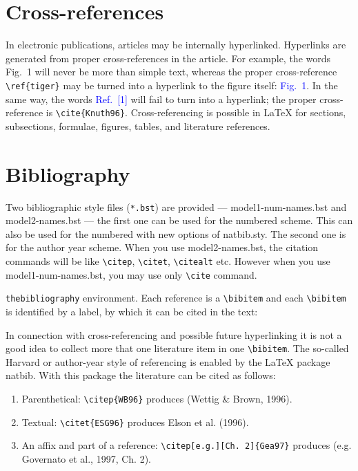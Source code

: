 \documentclass[a4paper,fleqn]{cas-dc}
\begin{document}
			\section{Cross-references}
			In electronic publications, articles may be internally
			hyperlinked. Hyperlinks are generated from proper
			cross-references in the article.  For example, the words
			\textcolor{black!80}{Fig.~1} will never be more than simple text,
			whereas the proper cross-reference \verb+\ref{tiger}+ may be
			turned into a hyperlink to the figure itself:
			\textcolor{blue}{Fig.~1}.  In the same way,
			the words \textcolor{blue}{Ref.~[1]} will fail to turn into a
			hyperlink; the proper cross-reference is \verb+\cite{Knuth96}+.
			Cross-referencing is possible in \LaTeX{} for sections,
			subsections, formulae, figures, tables, and literature
			references.
			
			\section{Bibliography}
			
			Two bibliographic style files (\verb+*.bst+) are provided ---
			{model1-num-names.bst} and {model2-names.bst} --- the first one can be
			used for the numbered scheme. This can also be used for the numbered
			with new options of {natbib.sty}. The second one is for the author year
			scheme. When  you use model2-names.bst, the citation commands will be
			like \verb+\citep+,  \verb+\citet+, \verb+\citealt+ etc. However when
			you use model1-num-names.bst, you may use only \verb+\cite+ command.
			
			\verb+thebibliography+ environment.  Each reference is a\linebreak
			\verb+\bibitem+ and each \verb+\bibitem+ is identified by a label,
			by which it can be cited in the text:
			
			\noindent In connection with cross-referencing and
			possible future hyperlinking it is not a good idea to collect
			more that one literature item in one \verb+\bibitem+.  The
			so-called Harvard or author-year style of referencing is enabled
			by the \LaTeX{} package {natbib}. With this package the
			literature can be cited as follows:
			
			\begin{enumerate}[\textbullet]
				\item Parenthetical: \verb+\citep{WB96}+ produces (Wettig \& Brown, 1996).
				\item Textual: \verb+\citet{ESG96}+ produces Elson et al. (1996).
				\item An affix and part of a reference:\break
				\verb+\citep[e.g.][Ch. 2]{Gea97}+ produces (e.g. Governato et
				al., 1997, Ch. 2).
			\end{enumerate}
			
\end{document}
